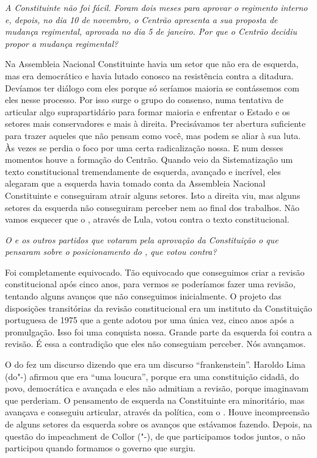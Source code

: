 \medskip

\noindent\emph{A Constituinte não foi fácil. Foram dois meses para aprovar o
regimento interno e, depois, no dia 10 de novembro, o Centrão apresenta
a sua proposta de mudança regimental, aprovada no dia 5 de janeiro. Por
que o Centrão decidiu propor a mudança regimental?}

Na Assembleia Nacional Constituinte havia um setor que
não era de esquerda, mas era democrático e havia lutado conosco na
resistência contra a ditadura. Devíamos ter diálogo com eles porque só
seríamos maioria se contássemos com eles nesse processo. Por isso surge
o grupo do consenso, numa tentativa de articular algo suprapartidário
para formar maioria e enfrentar o Estado e os setores mais conservadores
e mais à direita. Precisávamos ter abertura suficiente para trazer
aqueles que não pensam como você, mas podem se aliar à sua luta. Às
vezes se perdia o foco por uma certa radicalização nossa. E num desses
momentos houve a formação do Centrão. Quando veio da Sistematização um
texto constitucional tremendamente de esquerda, avançado e incrível,
eles alegaram que a esquerda havia tomado conta da Assembleia Nacional
Constituinte e conseguiram atrair alguns setores. Isto a direita viu,
mas alguns setores da esquerda não conseguiram perceber nem ao final dos
trabalhos. Não vamos esquecer que o , através de Lula, votou contra o
texto constitucional.

\medskip

\noindent\emph{O  e os outros partidos que votaram pela aprovação da
Constituição o que pensaram sobre o posicionamento do , que votou
contra?}

Foi completamente equivocado. Tão equivocado que
conseguimos criar a revisão constitucional após cinco anos, para vermos
se poderíamos fazer uma revisão, tentando alguns avanços que não
conseguimos inicialmente. O projeto das disposições transitórias da
revisão constitucional era um instituto da Constituição portuguesa de
1975 que a gente adotou por uma única vez, cinco anos após a
promulgação. Isso foi uma conquista nossa. Grande parte da esquerda foi
contra a revisão. É essa a contradição que eles não conseguiam perceber.
Nós avançamos.

O do fez um discurso dizendo que era um discurso ``frankenstein''.
Haroldo Lima (do"-) afirmou que era ``uma loucura'', porque era uma
constituição cidadã, do povo, democrática e avançada e eles não admitiam
a revisão, porque imaginavam que perderiam. O pensamento de esquerda na
Constituinte era minoritário, mas avançava e conseguiu articular,
através da política, com o . Houve incompreensão de alguns setores
da esquerda sobre os avanços que estávamos fazendo. Depois, na questão
do impeachment de Collor ("-), de que participamos todos juntos, o
 não participou quando formamos o governo que surgiu.


